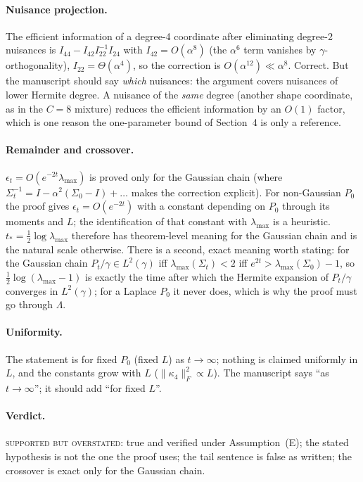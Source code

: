 \documentclass[11pt,a4paper]{article}
\newcommand{\sev}[1]{\textsc{#1}}
\newcommand{\Frob}[1]{\lVert #1 \rVert_{F}}
\newcommand{\tstar}{t_\ast}
\newcommand{\lmax}{\lambda_{\max}}
\theoremstyle{definition}
\theoremstyle{remark}
\begin{document}
\paragraph{Nuisance projection.} The efficient information of a degree-4 coordinate after eliminating degree-2 nuisances is $I_{44}-I_{42}I_{22}^{-1}I_{24}$ with $I_{42}=O(\alpha^8)$ (the $\alpha^6$ term vanishes by $\gamma$-orthogonality), $I_{22}=\Theta(\alpha^4)$, so the correction is $O(\alpha^{12})\ll\alpha^8$. Correct. But the manuscript should say \emph{which} nuisances: the argument covers nuisances of lower Hermite degree. A nuisance of the \emph{same} degree (another shape coordinate, as in the $C=8$ mixture) reduces the efficient information by an $O(1)$ factor, which is one reason the one-parameter bound of Section~4 is only a reference.

\paragraph{Remainder and crossover.} $\epsilon_t=O(e^{-2t}\lmax)$ is proved only for the Gaussian chain (where $\Sigma_t^{-1}=I-\alpha^2(\Sigma_0-I)+\dots$ makes the correction explicit). For non-Gaussian $P_0$ the proof gives $\epsilon_t=O(e^{-2t})$ with a constant depending on $P_0$ through its moments and $L$; the identification of that constant with $\lmax$ is a heuristic. $\tstar=\tfrac12\log\lmax$ therefore has theorem-level meaning for the Gaussian chain and is the natural scale otherwise. There is a second, exact meaning worth stating: for the Gaussian chain $P_t/\gamma\in L^2(\gamma)$ iff $\lmax(\Sigma_t)<2$ iff $e^{2t}>\lmax(\Sigma_0)-1$, so $\tfrac12\log(\lmax-1)$ is exactly the time after which the Hermite expansion of $P_t/\gamma$ converges in $L^2(\gamma)$; for a Laplace $P_0$ it never does, which is why the proof must go through $\Lambda$.

\paragraph{Uniformity.} The statement is for fixed $P_0$ (fixed $L$) as $t\to\infty$; nothing is claimed uniformly in $L$, and the constants grow with $L$ ($\Frob{\kappa_4}^2\propto L$). The manuscript says ``as $t\to\infty$''; it should add ``for fixed $L$''.

\paragraph{Verdict.} \sev{supported but overstated}: true and verified under Assumption~(E); the stated hypothesis is not the one the proof uses; the tail sentence is false as written; the crossover is exact only for the Gaussian chain.
\end{document}

